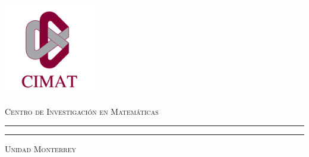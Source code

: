 \documentclass[12pt, letterpaper]{article}
\begin{document}
\thispagestyle{empty}


\thispagestyle{empty}

\begin{minipage}[c][0.1\textheight][c]{0.2\textwidth}
\begin{center}
    \includegraphics[width=4cm, height=4cm]{cimat}
\end{center}
\end{minipage}
\begin{minipage}[c][0.1\textheight][t]{0.8\textwidth}
\begin{center}
    {\hspace{2cm}\scshape Centro de Investigación en Matemáticas}
    \vspace{-.5cm}
\end{center}
\hspace*{1.0cm} \rule[0mm]{0.9\textwidth}{0.8mm}
\hspace*{1.17cm}   \rule[4mm]{0.9\textwidth}{0.1mm}
    \vspace{-1cm}
\begin{center}
    { \hspace{2cm}\scshape  Unidad Monterrey}
\end{center}
\end{minipage}
\end{document}
